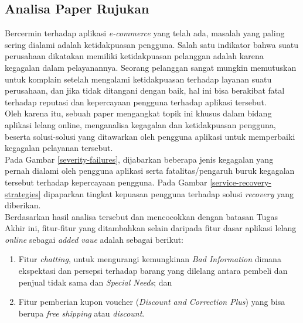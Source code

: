 
    \subsection{Analisa Paper Rujukan}
	    \label{analisa-paper-rujukan}
		\indent Bercermin terhadap aplikasi \textit{e-commerce} yang telah ada, masalah yang paling sering dialami adalah ketidakpuasan pengguna. Salah satu indikator bahwa suatu perusahaan dikatakan memiliki ketidakpuasan pelanggan adalah karena kegagalan dalam pelayanannya. Seorang pelanggan sangat mungkin memutuskan untuk komplain setelah mengalami ketidakpuasan terhadap layanan suatu perusahaan, dan jika tidak ditangani dengan baik, hal ini bisa berakibat fatal terhadap reputasi dan kepercayaan pengguna terhadap aplikasi tersebut. \\
		\indent Oleh karena itu, sebuah paper mengangkat topik ini khusus dalam bidang aplikasi lelang online, menganalisa kegagalan dan ketidakpuasan pengguna, beserta solusi-solusi yang ditawarkan oleh pengguna aplikasi untuk memperbaiki kegagalan pelayanan tersebut. \\
		\indent Pada Gambar \ref{severity-failures}, dijabarkan beberapa jenis kegagalan yang pernah dialami oleh pengguna aplikasi serta fatalitas/pengaruh buruk kegagalan tersebut terhadap kepercayaan pengguna. Pada Gambar \ref{service-recovery-strategies} dipaparkan tingkat kepuasan pengguna terhadap solusi \textit{recovery} yang diberikan.\\ 
		\indent Berdasarkan hasil analisa tersebut dan mencocokkan dengan batasan Tugas Akhir ini, fitur-fitur yang ditambahkan selain daripada fitur dasar aplikasi lelang \textit{online} sebagai \textit{added vaue} adalah sebagai berikut:
		\begin{enumerate}
			\item Fitur \textit{chatting}, untuk mengurangi kemungkinan \textit{Bad Information} dimana ekspektasi dan persepsi terhadap barang yang dilelang antara pembeli dan penjual tidak sama dan \textit{Special Needs}; dan
			\item Fitur pemberian kupon voucher (\textit{Discount and Correction Plus}) yang bisa berupa \textit{free shipping} atau \textit{discount}.
		\end{enumerate}
		
